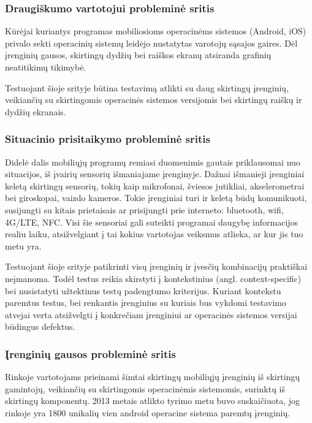 \documentclass{VUMIFPSkursinis}
\begin{document}
\subsubsection{Draugiškumo vartotojui probleminė sritis}
Kūrėjai kuriantys programas mobiliosioms operacinėms sistemos (Android, iOS) privalo sekti operacinių sistemų leidėjo nustatytas varotojų sąsajos gaires. Dėl įrenginių gausos, skirtingų dydžių bei raiškos ekranų atsiranda grafinių neatitikimų tikimybė. 

Testuojant šioje srityje būtina testavimą atlikti su daug skirtingų įrenginių, veikiančių su skirtingomis operacinės sistemos versijomis bei skirtingų raiškų ir dydžių ekranais.

\subsubsection{Situacinio prisitaikymo probleminė sritis}
Didelė dalis mobiliųjų programų remiasi duomenimis gautais priklausomai nuo situacijos, iš įvairių sensorių išmaniajame įrenginyje. Dažnai išmanieji įrenginiai keletą skirtingų sensorių, tokių kaip mikrofonai, šviesos jutikliai, akselerometrai bei giroskopai, vaizdo kameros. Tokie įrenginiai turi ir keletą būdų komunikuoti, susijungti su kitais prietaisais ar prisijungti prie interneto: bluetooth, wifi, 4G/LTE, NFC. Visi šie sensoriai gali suteikti programai daugybę informacijos realiu laiku, atsižvelgiant į tai kokius vartotojas veiksmus atlieka, ar kur jis tuo metu yra.

Testuojant šioje srityje patikrinti visų įrenginių ir įvesčių kombinacijų praktiškai neįmanoma. Todėl testus reikia skirstyti į kontekstinius (angl. context-specific) bei nusistatyti užtektinus testų padengtumo kriterijus. Kuriant kontekstu paremtus testus, bei renkantis įrenginius su kuriais bus vykdomi testavimo atvejai verta atsižvelgti į konkrečiam įrenginiui ar operacinės sistemos versijai būdingus defektus. \cite{android_bugs}

\subsubsection{Įrenginių gausos probleminė sritis}
Rinkoje vartotojams prieinami šimtai skirtingų mobiliųjų įrenginių iš skirtingų gamintojų, veikiančių su skirtingomis operacinėmis sistemomis, surinktų iš skirtingų komponentų. 2013 metais atlikto tyrimo metu buvo suskaičiuota, jog rinkoje yra 1800 unikalių vien android operacine sistema paremtų įrenginių. \cite{Muccini:2012:STM:2663608.2663615}
\end{document}
